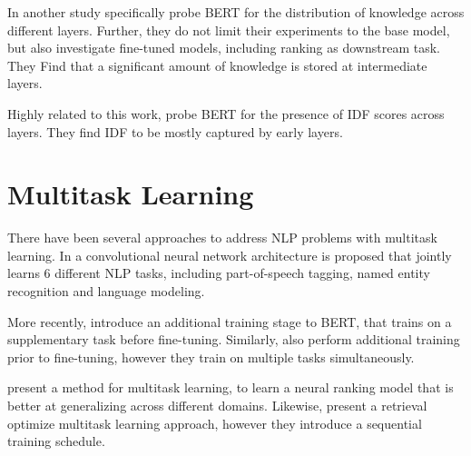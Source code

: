 In another study \cite{singh-etal-2020-bertnesia} specifically probe BERT for the distribution of knowledge across different layers. Further, they do not limit their experiments to the base model, but also investigate fine-tuned models, including ranking as downstream task. They Find that a significant amount of knowledge is stored at intermediate layers.

Highly related to this work, \cite{https://doi.org/10.48550/arxiv.2202.12191} probe BERT for the presence of IDF scores across layers. They find IDF to be mostly captured by early layers.

\section{Multitask Learning}
There have been several approaches to address NLP problems with multitask learning. In \cite{10.1145/1390156.1390177} a convolutional neural network architecture is proposed that jointly learns 6 different NLP tasks, including part-of-speech tagging, named entity recognition and language modeling.

More recently, \cite{DBLP:journals/corr/abs-1811-01088} introduce an additional training stage to BERT, that trains on a supplementary task before fine-tuning. Similarly, \cite{DBLP:journals/corr/abs-1901-11504} also perform additional training prior to fine-tuning, however they train on multiple tasks simultaneously.

\cite{maillard-etal-2021-multi} present a method for multitask learning, to learn a neural ranking model that is better at generalizing across different domains. Likewise, \cite{Fun2021EfficientRO} present a retrieval optimize multitask learning approach, however they introduce a sequential training schedule.